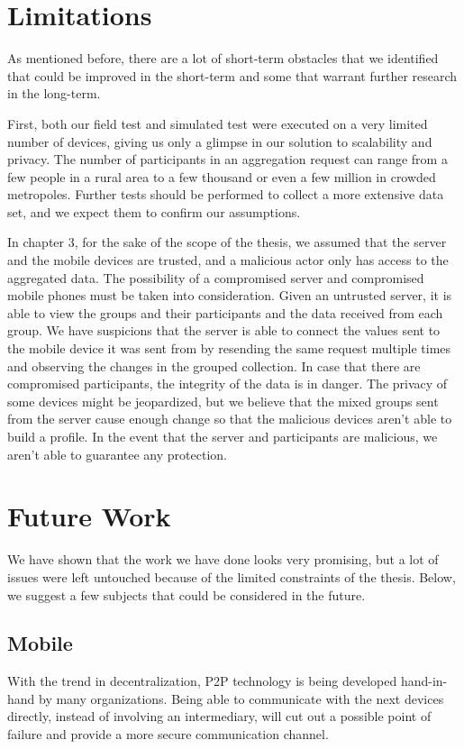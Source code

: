 \section{Limitations}
As mentioned before, there are a lot of short-term obstacles that we identified that could be improved in the short-term and some that warrant further research in the long-term.

First, both our field test and simulated test were executed on a very limited number of devices, giving us only a glimpse in our solution to scalability and privacy. The number of participants in an aggregation request can range from a few people in a rural area to a few thousand or even a few million in crowded metropoles. Further tests should be performed to collect a more extensive data set, and we expect them to confirm our assumptions.

In chapter 3, for the sake of the scope of the thesis, we assumed that the server and the mobile devices are trusted, and a malicious actor only has access to the aggregated data. The possibility of a compromised server and compromised mobile phones must be taken into consideration. Given an untrusted server, it is able to view the groups and their participants and the data received from each group. We have suspicions that the server is able to connect the values sent to the mobile device it was sent from by resending the same request multiple times and observing the changes in the grouped collection. In case that there are compromised participants, the integrity of the data is in danger. The privacy of some devices might be jeopardized, but we believe that the mixed groups sent from the server cause enough change so that the malicious devices aren't able to build a profile. In the event that the server and participants are malicious, we aren't able to guarantee any protection.

\section{Future Work}
We have shown that the work we have done looks very promising, but a lot of issues were left untouched because of the limited constraints of the thesis. Below, we suggest a few subjects that could be considered in the future. 

\subsection{Mobile}
With the trend in decentralization, P2P technology is being developed hand-in-hand by many organizations. Being able to communicate with the next devices directly, instead of involving an intermediary, will cut out a possible point of failure and provide a more secure communication channel.

